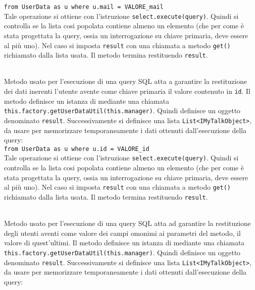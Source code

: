 \begin{description}
	\verb|from UserData as u where u.mail = VALORE_mail|\\
	
	Tale operazione si ottiene con l'istruzione \verb|select.execute(query)|. Quindi si controlla se la lista cosi popolata contiene almeno un elemento (che per come è stata progettata la query, ossia un interrogazione su chiave primaria, deve essere al più uno). Nel caso si imposta \texttt{result} con una chiamata a metodo \texttt{get()} richiamato dalla lista usata. Il metodo termina restituendo \texttt{result}.	
	
	\item{}\\
	Metodo usato per l'esecuzione di una query SQL atta a garantire la restituzione dei dati inerenti l'utente avente come chiave primaria il valore contenuto in \texttt{id}. Il metodo definisce un istanza di  mediante una chiamata \verb|this.factory.getUserDataUtil(this.manager)|. Quindi definisce un oggetto  denominato \texttt{result}. Successivamente si definisce una lista \texttt{List<IMyTalkObject>}, da usare per memorizzare temporaneamente i dati ottenuti dall'esecuzione della query:\\
	
	\verb|from UserData as u where u.id = VALORE_id|\\
	
	Tale operazione si ottiene con l'istruzione \verb|select.execute(query)|. Quindi si controlla se la lista cosi popolata contiene almeno un elemento (che per come è stata progettata la query, ossia un interrogazione su chiave primaria, deve essere al più uno). Nel caso si imposta \texttt{result} con una chiamata a metodo \texttt{get()} richiamato dalla lista usata. Il metodo termina restituendo \texttt{result}.
	
	\item{}\\
	Metodo usato per l'esecuzione di una query SQL atta ad garantire la restituzione degli utenti aventi come valore dei campi omonimi ai parametri del metodo, il valore di quest'ultimi. Il metodo definisce un istanza di  mediante una chiamata \\ \verb|this.factory.getUserDataUtil(this.manager)|. Quindi definisce un oggetto  denominato \texttt{result}. Successivamente si definisce una lista \texttt{List<IMyTalkObject>}, da usare per memorizzare temporaneamente i dati ottenuti dall'esecuzione della query:\\
	

\end{description}
